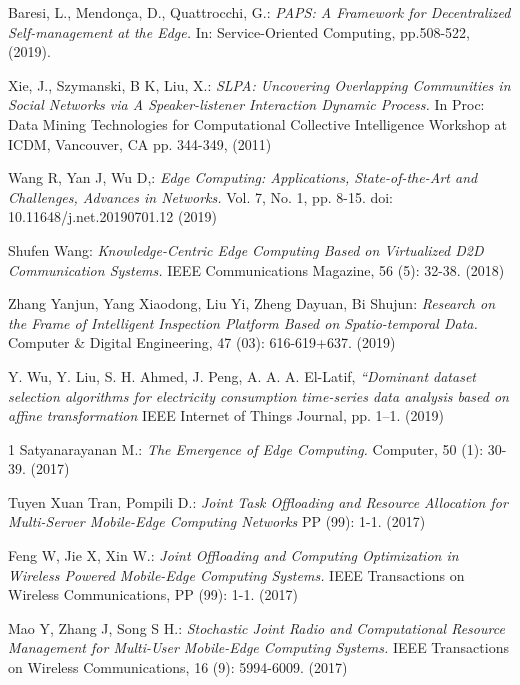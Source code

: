 \begin{thebibliography}{9}
        Baresi, L., Mendonça, D., Quattrocchi, G.: 
        \textit{PAPS: A Framework for Decentralized Self-management at the Edge.}
        In: Service-Oriented Computing, pp.508-522, (2019).   

        Xie, J., Szymanski, B K, Liu, X.:
        \textit{SLPA: Uncovering Overlapping Communities in Social Networks via
        A Speaker-listener Interaction Dynamic Process.}
        In Proc: Data Mining Technologies for Computational Collective 
        Intelligence Workshop at ICDM, Vancouver, CA pp. 344-349, (2011)

        Wang R, Yan J, Wu D,:
        \textit{Edge Computing: Applications, State-of-the-Art and Challenges, Advances in Networks.}
        Vol. 7, No. 1, pp. 8-15. doi: 10.11648/j.net.20190701.12 (2019)

        Shufen Wang:
        \textit{Knowledge-Centric Edge Computing Based on Virtualized D2D Communication Systems.}
        IEEE Communications Magazine, 56 (5): 32-38. (2018)

        Zhang Yanjun, Yang Xiaodong, Liu Yi, Zheng Dayuan, Bi Shujun:
        \textit{Research on the Frame of Intelligent Inspection Platform Based on Spatio-temporal Data.}
        Computer \& Digital Engineering, 47 (03): 616-619+637. (2019)

        Y. Wu, Y. Liu, S. H. Ahmed, J. Peng, A. A. A. El-Latif,
        \textit{“Dominant dataset selection algorithms for electricity consumption time-series data analysis based on affine transformation}
        IEEE Internet of Things Journal, pp. 1–1. (2019)

    1   Satyanarayanan M.:
        \textit{The Emergence of Edge Computing.}
        Computer, 50 (1): 30-39. (2017)
    
        Tuyen Xuan Tran, Pompili D.:
        \textit{Joint Task Offloading and Resource Allocation for Multi-Server Mobile-Edge Computing Networks} PP (99): 1-1. (2017)

        Feng W, Jie X, Xin W.:
        \textit{Joint Offloading and Computing Optimization in Wireless Powered Mobile-Edge Computing Systems.} 
        IEEE Transactions on Wireless Communications, PP (99): 1-1. (2017)

        Mao Y, Zhang J, Song S H.:
        \textit{Stochastic Joint Radio and Computational Resource Management for Multi-User Mobile-Edge Computing Systems.} 
        IEEE Transactions on Wireless Communications, 16 (9): 5994-6009. (2017)


\end{thebibliography}
